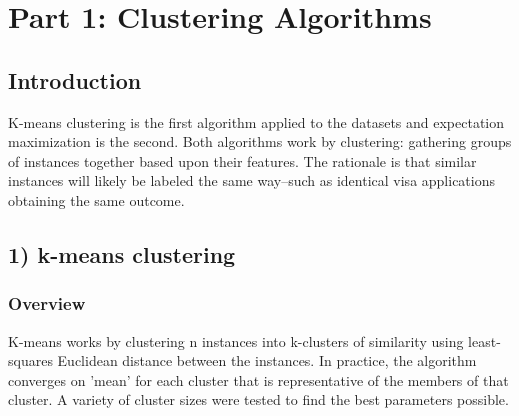 \documentclass[h]{article}
\begin{document}
\section*{Part 1: Clustering Algorithms}
\subsection*{Introduction}  
K-means clustering is the first algorithm applied to the datasets and expectation maximization is the second. 
 Both algorithms work by clustering: gathering groups of instances together 
 based upon their features.  The rationale is that similar instances will likely 
 be labeled the same way--such as identical visa applications obtaining the same 
 outcome.

\subsection*{1) k-means clustering}  
\subsubsection*{Overview}
K-means works by clustering n instances into k-clusters of similarity using least-squares Euclidean distance
 between the instances.  In practice, the algorithm converges on 'mean' for each cluster that is representative of the 
 members of that cluster.   A variety of cluster sizes were tested to find the best parameters 
 possible.
 
\end{document}
